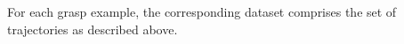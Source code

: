 %
For each grasp example, the corresponding dataset comprises the set of trajectories as described above.




